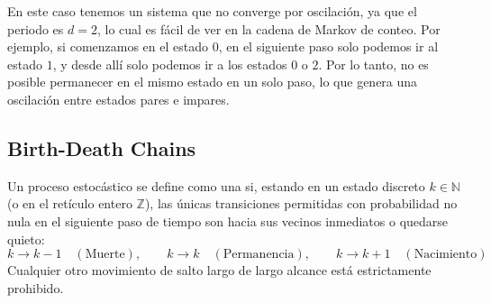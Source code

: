 \begin{center}
\end{center}
En este caso tenemos un sistema que no converge por oscilación, ya que el periodo es $d=2$, lo cual es fácil de ver en la cadena de Markov de conteo. Por ejemplo, si comenzamos en el estado $0$, en el siguiente paso solo podemos ir al estado $1$, y desde allí solo podemos ir a los estados $0$ o $2$. Por lo tanto, no es posible permanecer en el mismo estado en un solo paso, lo que genera una oscilación entre estados pares e impares. 

\subsection{Birth-Death Chains}
\begin{definicion}
    Un proceso estocástico se define como una  si, estando en un estado discreto $k \in \mathbb{N}$ (o en el retículo entero $\mathbb{Z}$), las únicas transiciones permitidas con probabilidad no nula en el siguiente paso de tiempo son hacia sus vecinos inmediatos o quedarse quieto:
    \[
    k \longrightarrow k-1 \quad (\text{Muerte}), \qquad k \longrightarrow k \quad (\text{Permanencia}), \qquad k \longrightarrow k+1 \quad (\text{Nacimiento})
    \]
    Cualquier otro movimiento de salto largo de largo alcance está estrictamente prohibido.
\end{definicion}

